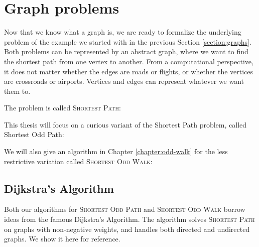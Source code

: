\section{Graph problems}
\label{section:graph-problems}

Now that we know what a graph is, we are ready to formalize the underlying problem of the example we started with in the previous Section \ref{section:graphs}. Both problems can be represented by an abstract graph, where we want to find the shortest path from one vertex to another. From a computational perspective, it does not matter whether the edges are roads or flights, or whether the vertices are crossroads or airports. Vertices and edges can represent whatever we want them to. 

The problem is called \textsc{Shortest Path}:


This thesis will focus on a curious variant of the Shortest Path problem, called Shortest Odd Path:


We will also give an algorithm in Chapter \ref{chapter:odd-walk} for the less restrictive variation called \textsc{Shortest Odd Walk}:


\subsection{Dijkstra's Algorithm}
Both our algorithms for \textsc{Shortest Odd Path} and \textsc{Shortest Odd Walk} borrow ideas from the famous Dijkstra's Algorithm. The algorithm solves \textsc{Shortest Path} on graphs with non-negative weights, and handles both directed and undirected graphs. We show it here for reference.

